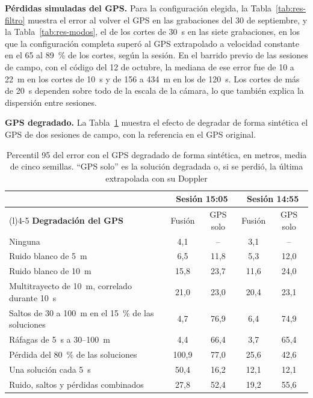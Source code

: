 \textbf{Pérdidas simuladas del GPS.}
Para la configuración elegida, la Tabla~\ref{tab:res-filtro} muestra el error al volver el GPS en las grabaciones del 30 de septiembre, y la Tabla~\ref{tab:res-modos}, el de los cortes de 30~s en las siete grabaciones, en los que la configuración completa superó al GPS extrapolado a velocidad constante en el 65 al 89~\% de los cortes, según la sesión.
En el barrido previo de las sesiones de campo, con el código del 12 de octubre, la mediana de ese error fue de 10 a 22~m en los cortes de 10~s y de 156 a 434~m en los de 120~s.
Los cortes de más de 20~s dependen sobre todo de la escala de la cámara, lo que también explica la dispersión entre sesiones.

\textbf{GPS degradado.}
La Tabla~\ref{tab:res-gps-degradado} muestra el efecto de degradar de forma sintética el GPS de dos sesiones de campo, con la referencia en el GPS original.

\begin{table}[H]
\centering
\caption[Percentil 95 del error con el GPS degradado]{Percentil 95 del error con el GPS degradado de forma sintética, en metros, media de cinco semillas. ``GPS solo'' es la solución degradada o, si se perdió, la última extrapolada con su Doppler}
\label{tab:res-gps-degradado}
\small
\begin{tabularx}{\textwidth}{@{}>{\raggedright\arraybackslash}X cccc@{}}
\toprule
& \multicolumn{2}{c}{\textbf{Sesión 15:05}} & \multicolumn{2}{c}{\textbf{Sesión 14:55}} \\
\cmidrule(lr){2-3}\cmidrule(l){4-5}
\textbf{Degradación del GPS} & Fusión & GPS solo & Fusión & GPS solo \\
\midrule
Ninguna & 4,1 & -- & 3,1 & -- \\
Ruido blanco de 5~m & 6,5 & 11,8 & 5,3 & 12,0 \\
Ruido blanco de 10~m & 15,8 & 23,7 & 11,6 & 24,0 \\
Multitrayecto de 10~m, correlado durante 10~s & 21,0 & 23,0 & 20,4 & 23,1 \\
Saltos de 30 a 100~m en el 15~\% de las soluciones & 4,7 & 76,9 & 6,4 & 74,9 \\
Ráfagas de 5~s a 30--100~m & 4,4 & 66,4 & 3,7 & 65,4 \\
Pérdida del 80~\% de las soluciones & 100,9 & 77,0 & 25,6 & 42,6 \\
Una solución cada 5~s & 50,4 & 16,2 & 12,1 & 12,1 \\
Ruido, saltos y pérdidas combinados & 27,8 & 52,4 & 19,2 & 55,6 \\
\bottomrule
\end{tabularx}
\end{table}

